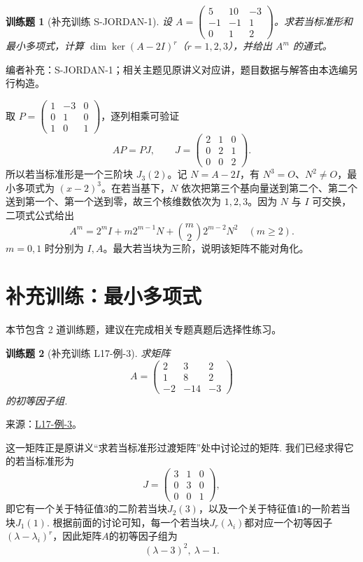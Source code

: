 \documentclass[UTF8,12pt,a4paper,fontset=fandol]{ctexart}
\newtheorem{exercise}{训练题}[section]
\begin{document}
\begin{exercise}[补充训练 S-JORDAN-1]\label{prob:S-JORDAN-1}
设 $A=\begin{pmatrix}5&10&-3\\-1&-1&1\\0&1&2\end{pmatrix}$。求若当标准形和最小多项式，计算 $\dim\ker(A-2I)^r$（$r=1,2,3$），并给出 $A^m$ 的通式。
\end{exercise}
\noindent 编者补充：S-JORDAN-1；相关主题见原讲义对应讲，题目数据与解答由本选编另行构造。
\begin{solve}
取 $P=\begin{pmatrix}1&-3&0\\0&1&0\\1&0&1\end{pmatrix}$，逐列相乘可验证
\[AP=PJ,\qquad J=\begin{pmatrix}2&1&0\\0&2&1\\0&0&2\end{pmatrix}.\]
所以若当标准形是一个三阶块 $J_3(2)$。记 $N=A-2I$，有 $N^3=O$、$N^2\ne O$，最小多项式为 $(x-2)^3$。在若当基下，$N$ 依次把第三个基向量送到第二个、第二个送到第一个、第一个送到零，故三个核维数依次为 $1,2,3$。因为 $N$ 与 $I$ 可交换，二项式公式给出
\[A^m=2^mI+m2^{m-1}N+\binom m22^{m-2}N^2\quad(m\ge2).\]
$m=0,1$ 时分别为 $I,A$。最大若当块为三阶，说明该矩阵不能对角化。
\end{solve}

\section{补充训练：最小多项式}

本节包含 2 道训练题，建议在完成相关专题真题后选择性练习。

\begin{exercise}[补充训练 L17-例-3]\label{prob:L17-例-3}
求矩阵
    \[
        A=\begin{pmatrix}
                2 & 3 & 2 \\
                1 & 8 & 2 \\
                -2 & -14 & -3
            \end{pmatrix}
    \]
    的初等因子组.
\end{exercise}
\noindent 来源：\href{https://github.com/yhwu-is/Linear-Algebra-Left-Undone/blob/new/%E8%AE%B2%E4%B9%89/%E4%B8%93%E9%A2%98/17%20%E5%A4%9A%E9%A1%B9%E5%BC%8F%E7%9A%84%E8%BF%9B%E4%B8%80%E6%AD%A5%E8%AE%A8%E8%AE%BA.tex}{L17-例-3}。
\begin{solve}
这一矩阵正是原讲义“求若当标准形过渡矩阵”处中讨论过的矩阵. 我们已经求得它的若当标准形为
    \[
        J=\begin{pmatrix}
                3 & 1 & 0 \\
                0 & 3 & 0 \\
                0 & 0 & 1
            \end{pmatrix},
    \]
    即它有一个关于特征值$3$的二阶若当块$J_2(3)$，以及一个关于特征值$1$的一阶若当块$J_1(1)$. 根据前面的讨论可知，每一个若当块$J_r(\lambda_i)$都对应一个初等因子$(\lambda-\lambda_i)^r$，因此矩阵$A$的初等因子组为
    \[
        (\lambda-3)^2,\ \lambda-1.
    \]
\end{solve}
\end{document}
